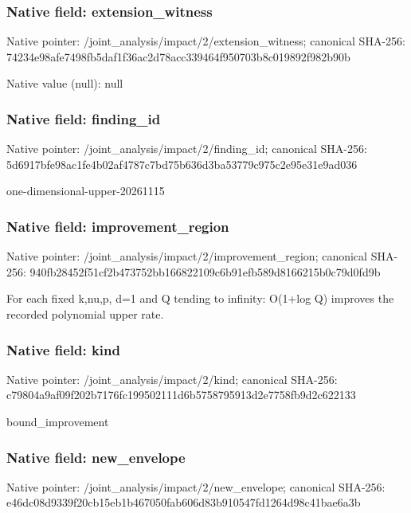\documentclass[10pt,a4paper]{article}
\begin{document}
\subsubsection{Native field: extension\_\allowbreak{}witness}
Native pointer: /joint\_\allowbreak{}analysis/impact/2/extension\_\allowbreak{}witness; canonical SHA-256: 74234e98afe7498fb5daf1f36ac2d78acc339464f950703b8c019892f982b90b

Native value (null): null

\subsubsection{Native field: finding\_\allowbreak{}id}
Native pointer: /joint\_\allowbreak{}analysis/impact/2/finding\_\allowbreak{}id; canonical SHA-256: 5d6917bfe98ac1fe4b02af4787c7bd75b636d3ba53779c975c2e95e31e9ad036

\begingroup\raggedright\sloppy one-dimensional-upper-20261115\par\endgroup

\subsubsection{Native field: improvement\_\allowbreak{}region}
Native pointer: /joint\_\allowbreak{}analysis/impact/2/improvement\_\allowbreak{}region; canonical SHA-256: 940fb28452f51cf2b473752bb166822109c6b91efb589d8166215b0c79d0fd9b

\begingroup\raggedright\sloppy For each fixed k,\allowbreak{}nu,\allowbreak{}p,\allowbreak{} d=\allowbreak{}1 and Q tending to infinity:\allowbreak{} O(1+log Q) improves the recorded polynomial upper rate.\par\endgroup

\subsubsection{Native field: kind}
Native pointer: /joint\_\allowbreak{}analysis/impact/2/kind; canonical SHA-256: c79804a9af09f202b7176fc199502111d6b5758795913d2e7758fb9d2c622133

\begingroup\raggedright\sloppy bound\_\allowbreak{}improvement\par\endgroup

\subsubsection{Native field: new\_\allowbreak{}envelope}
Native pointer: /joint\_\allowbreak{}analysis/impact/2/new\_\allowbreak{}envelope; canonical SHA-256: e46dc08d9339f20cb15eb1b467050fab606d83b910547fd1264d98c41bae6a3b
\end{document}

